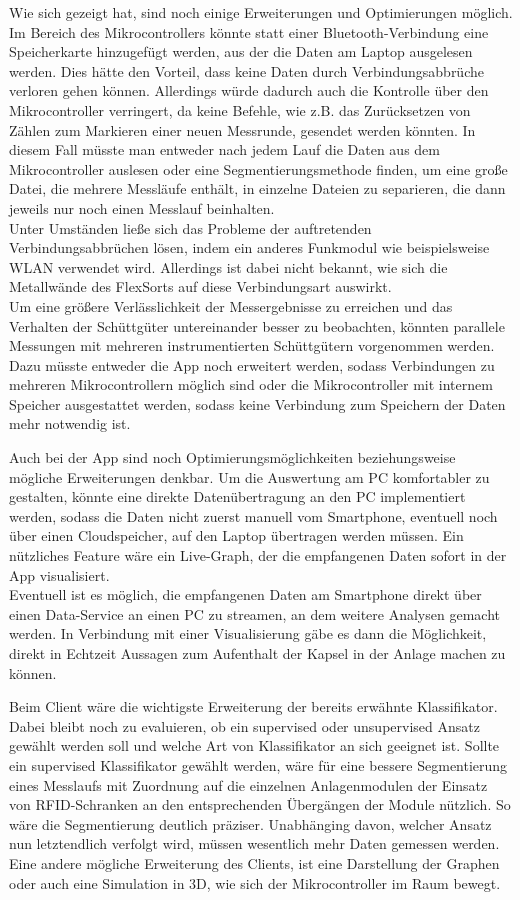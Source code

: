 Wie sich gezeigt hat, sind noch einige Erweiterungen und Optimierungen möglich. 
Im Bereich des Mikrocontrollers könnte statt einer Bluetooth-Verbindung eine Speicherkarte hinzugefügt werden, aus der die Daten am Laptop ausgelesen werden. Dies hätte den Vorteil, dass keine Daten durch Verbindungsabbrüche verloren gehen können. Allerdings würde dadurch auch die Kontrolle über den Mikrocontroller verringert, da keine Befehle, wie z.B. das Zurücksetzen von Zählen zum Markieren einer neuen Messrunde, gesendet werden könnten. In diesem Fall müsste man entweder nach jedem Lauf die Daten aus dem Mikrocontroller auslesen oder eine Segmentierungsmethode finden, um eine große Datei, die mehrere Messläufe enthält, in einzelne Dateien zu separieren, die dann jeweils nur noch einen Messlauf beinhalten. \\
Unter Umständen ließe sich das Probleme der auftretenden Verbindungsabbrüchen lösen, indem ein anderes Funkmodul wie beispielsweise WLAN verwendet wird. Allerdings ist dabei nicht bekannt, wie sich die Metallwände des FlexSorts auf diese Verbindungsart auswirkt.\\
Um eine größere Verlässlichkeit der Messergebnisse zu erreichen und das Verhalten der Schüttgüter untereinander besser zu beobachten, könnten parallele Messungen mit mehreren instrumentierten Schüttgütern vorgenommen werden. Dazu müsste entweder die App noch erweitert werden, sodass Verbindungen zu mehreren Mikrocontrollern möglich sind oder die Mikrocontroller mit internem Speicher ausgestattet werden, sodass keine Verbindung zum Speichern der Daten mehr notwendig ist.

Auch bei der App sind noch Optimierungsmöglichkeiten beziehungsweise mögliche Erweiterungen denkbar. Um die Auswertung am PC komfortabler zu gestalten, könnte eine direkte Datenübertragung an den PC implementiert werden, sodass die Daten nicht zuerst manuell vom Smartphone, eventuell noch über einen Cloudspeicher, auf den Laptop übertragen werden müssen. 
Ein nützliches Feature wäre ein Live-Graph, der die empfangenen Daten sofort in der App visualisiert.\\
Eventuell ist es möglich, die empfangenen Daten am Smartphone direkt über einen Data-Service an einen PC zu streamen, an dem weitere Analysen gemacht werden. In Verbindung mit einer Visualisierung gäbe es dann die Möglichkeit, direkt in Echtzeit Aussagen zum Aufenthalt der Kapsel in der Anlage machen zu können. 

Beim Client wäre die wichtigste Erweiterung der bereits erwähnte Klassifikator. Dabei bleibt noch zu evaluieren, ob ein supervised oder unsupervised Ansatz gewählt werden soll und welche Art von Klassifikator an sich geeignet ist. Sollte ein supervised Klassifikator gewählt werden, wäre für eine bessere Segmentierung eines Messlaufs mit Zuordnung auf die einzelnen Anlagenmodulen der Einsatz von RFID-Schranken an den entsprechenden Übergängen der Module nützlich. So wäre die Segmentierung deutlich präziser. Unabhänging davon, welcher Ansatz nun letztendlich verfolgt wird, müssen wesentlich mehr Daten gemessen werden.
Eine andere mögliche Erweiterung des Clients, ist eine Darstellung der Graphen oder auch eine Simulation in 3D, wie sich der Mikrocontroller im Raum bewegt.